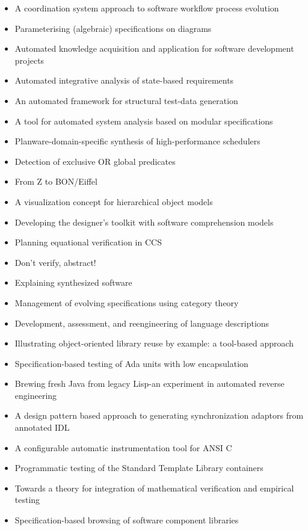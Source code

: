 {\begin{itemize}[itemsep=-1ex]
  \item A coordination system approach to software workflow process evolution
  \item Parameterising (algebraic) specifications on diagrams
  \item Automated knowledge acquisition and application for software development projects
  \item Automated integrative analysis of state-based requirements
  \item An automated framework for structural test-data generation
  \item A tool for automated system analysis based on modular specifications
  \item Planware-domain-specific synthesis of high-performance schedulers
  \item Detection of exclusive OR global predicates
  \item From Z to BON/Eiffel
  \item A visualization concept for hierarchical object models
  \item Developing the designer's toolkit with software comprehension models
  \item Planning equational verification in CCS
  \item Don't verify, abstract!
  \item Explaining synthesized software
  \item Management of evolving specifications using category theory
  \item Development, assessment, and reengineering of language descriptions
  \item Illustrating object-oriented library reuse by example: a tool-based approach
  \item Specification-based testing of Ada units with low encapsulation
  \item Brewing fresh Java from legacy Lisp-an experiment in automated reverse engineering
  \item A design pattern based approach to generating synchronization adaptors from annotated IDL
  \item A configurable automatic instrumentation tool for ANSI C
  \item Programmatic testing of the Standard Template Library containers
  \item Towards a theory for integration of mathematical verification and empirical testing
  \item Specification-based browsing of software component libraries 
\end{itemize}
}

